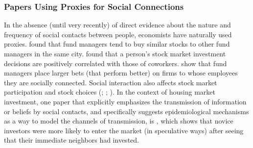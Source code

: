 
\hypertarget{proxies}{}
\subsubsection{Papers Using Proxies for Social Connections}\label{subsubsec:proxies}

In the absence (until very recently) of direct evidence about the nature and frequency of social contacts between people, economists have naturally used proxies.    \href{http://www.columbia.edu/~hh2679/ThyNeighborJF.pdf}{\cite{hong2005thy}} found that fund managers tend to buy similar stocks to other fund managers in the same city. \href{https://github.com/iworld1991/EpiExp/blob/master/Literature/hvide2015social.pdf}{\cite{hvide2015social}} found that a person's stock market investment decisions are positively correlated with those of coworkers.  \href{https://www.jstor.org/stable/10.1086/592415}{\cite{cohen2008small}} show that fund managers place larger bets (that perform better) on firms to whose employees they are socially connected.  Social interaction also affects stock market participation and stock choices (\href{https://github.com/iworld1991/EpiExp/blob/master/Literature/hong2004social.pdf}{\cite{hong2004social}}; \href{https://onlinelibrary.wiley.com/doi/abs/10.1111/j.1540-6261.2008.01364.x}{\cite{brown2008neighbors}};  \href{https://github.com/iworld1991/EpiExp/blob/master/Literature/ivkovic2007information.pdf}{\cite{ivkovic2007information}}). %
In the context of housing market investment, one paper that explicitly emphasizes the transmission of information or beliefs by social contacts, and specifically suggests epidemiological mechanisms as a way to model the channels of transmission, is
\href{https://www.aeaweb.org/articles?id=10.1257/aer.20171611&from=f}{\cite{bayer2021speculative}}, which shows that novice investors were more likely to enter the market (in speculative ways) after seeing that their immediate neighbors had invested.



